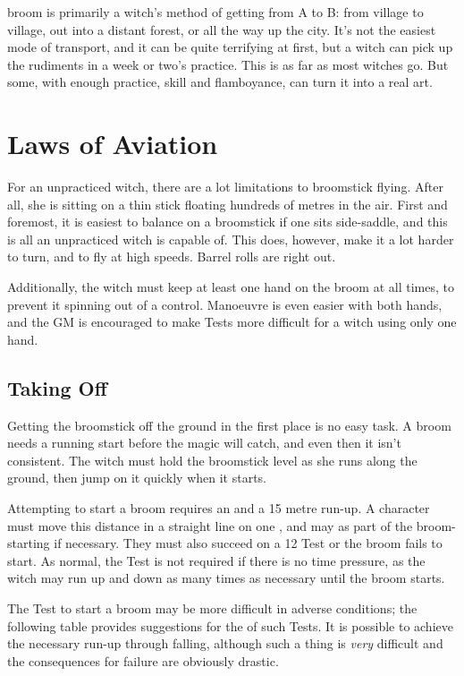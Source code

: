 
 broom is primarily a witch's method of getting from A to B: from village to village, out into a distant forest, or all the way up the city.
It's not the easiest mode of transport, and it can be quite terrifying at first, but a witch can pick up the rudiments in a week or two's practice.
This is as far as most witches go.
But some, with enough practice, skill and flamboyance, can turn it into a real art.

\section{Laws of Aviation}

For an unpracticed witch, there are a lot limitations to broomstick flying.
After all, she is sitting on a thin stick floating hundreds of metres in the air.
First and foremost, it is easiest to balance on a broomstick if one sits side-saddle, and this is all an unpracticed witch is capable of.
This does, however, make it a lot harder to turn, and to fly at high speeds.
Barrel rolls are right out.

Additionally, the witch must keep at least one hand on the broom at all times, to prevent it spinning out of a control.
Manoeuvre is even easier with both hands, and the GM is encouraged to make  Tests more difficult for a witch using only one hand.

\subsection{Taking Off}

Getting the broomstick off the ground in the first place is no easy task.
A broom needs a running start before the magic will catch, and even then it isn't consistent.
The witch must hold the broomstick level as she runs along the ground, then jump on it quickly when it starts.

Attempting to start a broom requires an {\action} and a 15 metre run-up.
A character must move this distance in a straight line on one {\turn}, and may  as part of the broom-starting {\action} if necessary.
They must also succeed on a {\tn} 12  Test or the broom fails to start.
As normal, the Test is not required if there is no time pressure, as the witch may run up and down as many times as necessary until the broom starts.

The Test to start a broom may be more difficult in adverse conditions; the following table provides suggestions for the {\tn} of such Tests.
It is possible to achieve the necessary run-up through falling, although such a thing is \emph{very} difficult and the consequences for failure are obviously drastic.


